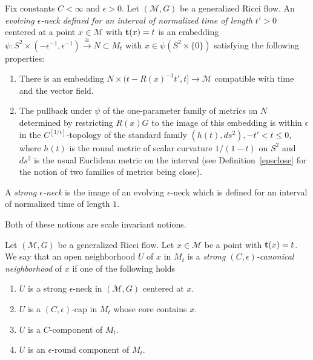 \begin{definition}\label{def:strong-epsilon-neck-canonical-neighborhood}
\label{defncanonnbhd}
Fix constants $C<\infty$ and $\epsilon>0$. Let $({\mathcal M},G)$ be
a generalized Ricci flow. An {\em evolving  $\epsilon$-neck defined
for an interval of normalized time of length
$t'>0$} centered at a point $x\in
{\mathcal M}$ with ${\bf t}(x)=t$ is an embedding $\psi\colon
S^2\times (-\epsilon^{-1},\epsilon^{-1})\stackrel{\cong}{\to}
N\subset M_t$ with $x\in \psi(S^2\times\{0\})$ satisfying the
following properties:
\begin{enumerate}
\item[(1)] There is an embedding $N\times (t-R(x)^{-1}t',t]\to {\mathcal
M}$ compatible with time and the vector field.
\item[(2)] The pullback under $\psi$ of the one-parameter family of
metrics on $N$ determined by restricting $R(x)G$ to the image of
this embedding is within $\epsilon$ in the
$C^{[1/\epsilon]}$-topology of the standard family $(h(t),ds^2),
-t'<t\le 0$, where $h(t)$ is the round metric of scalar curvature
$1/(1-t)$ on $S^2$ and $ds^2$ is the usual Euclidean metric on the
interval (see Definition~\ref{epsclose} for the notion of two
families of metrics being close).
\end{enumerate}
A {\em strong $\epsilon$-neck} is
the image of an evolving $\epsilon$-neck which is defined for an
interval of normalized time of length  $1$.

Both of these notions are scale invariant notions.

Let $({\mathcal M},G)$ be a generalized Ricci flow. Let $x\in
{\mathcal M}$ be a point with ${\bf t}(x)=t$. We say that an open
neighborhood $U$ of $x$ in $M_t$  is a {\em strong
$(C,\epsilon)$-canonical neighborhood} of $x$ if one of the following holds
\begin{enumerate}
\item[(1)]   $U$ is a strong $\epsilon$-neck in $({\mathcal M},G)$ centered at $x$.
\item[(2)] $U$ is a $(C,\epsilon)$-cap in $M_t$ whose  core contains $x$.
\item[(3)] $U$ is a $C$-component of $M_t$.
\item[(4)] $U$ is an $\epsilon$-round component of $M_t$.
\end{enumerate}
\end{definition}


